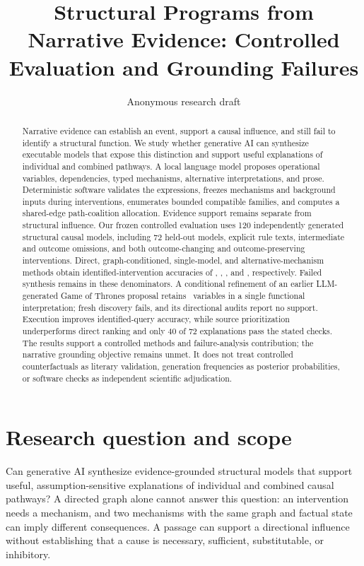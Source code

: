 \documentclass{svproc}
\begin{document}
\mainmatter
\title{Structural Programs from Narrative Evidence: Controlled Evaluation and Grounding Failures}
\author{Anonymous research draft}
\maketitle
\begin{abstract}
Narrative evidence can establish an event, support a causal influence, and still fail to identify a structural function. We study whether generative AI can synthesize executable models that expose this distinction and support useful explanations of individual and combined pathways. A local language model proposes operational variables, dependencies, typed mechanisms, alternative interpretations, and prose. Deterministic software validates the expressions, freezes mechanisms and background inputs during interventions, enumerates bounded compatible families, and computes a shared-edge path-coalition allocation. Evidence support remains separate from structural influence. Our frozen controlled evaluation uses 120 independently generated structural causal models, including 72 held-out models, explicit rule texts, intermediate and outcome omissions, and both outcome-changing and outcome-preserving interventions. Direct, graph-conditioned, single-model, and alternative-mechanism methods obtain identified-intervention accuracies of \AccDirect, \AccGraph, \AccSingle, and \AccAlt, respectively. Failed synthesis remains in these denominators. A conditional refinement of an earlier LLM-generated Game of Thrones proposal retains \AppNodes\ variables in a single functional interpretation; fresh discovery fails, and its directional audits report no support. Execution improves identified-query accuracy, while source prioritization underperforms direct ranking and only 40 of 72 explanations pass the stated checks. The results support a controlled methods and failure-analysis contribution; the narrative grounding objective remains unmet. It does not treat controlled counterfactuals as literary validation, generation frequencies as posterior probabilities, or software checks as independent scientific adjudication.
\end{abstract}

\section{Research question and scope}
Can generative AI synthesize evidence-grounded structural models that support useful, assumption-sensitive explanations of individual and combined causal pathways? A directed graph alone cannot answer this question: an intervention needs a mechanism, and two mechanisms with the same graph and factual state can imply different consequences. A passage can support a directional influence without establishing that a cause is necessary, sufficient, substitutable, or inhibitory.
\end{document}
